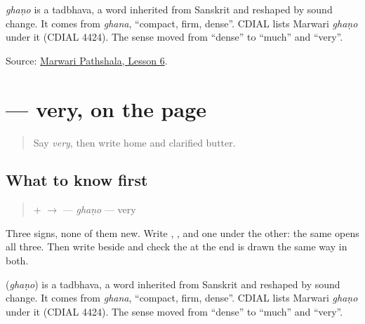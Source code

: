 \begin{cousinweb}
\emph{ghaṇo} is a tadbhava, a word inherited from Sanskrit and reshaped by sound change. It comes from \emph{ghana}, \textquotedblleft{}compact, firm, dense\textquotedblright{}. CDIAL lists Marwari \emph{ghaṇo} under it (CDIAL 4424). The sense moved from \textquotedblleft{}dense\textquotedblright{} to \textquotedblleft{}much\textquotedblright{} and \textquotedblleft{}very\textquotedblright{}.
\end{cousinweb}

\begin{tcolorbox}[breakable,colback=teal!4,colframe=teal!35!black,title={Before you move on}]
Source: \href{https://www.marwaripathshala.com/marwari-lesson-6-english}{Marwari Pathshala, Lesson 6}.
\end{tcolorbox}
\section[\texorpdfstring{\mw{घणो} (ghaṇo)}{घणो (ghaṇo)}]{ — very, on the page}

\label{lesson:MW-C23-ghano}



\begin{quote}
Say \emph{very}, then write home and clarified butter.
\end{quote}

\subsection*{What to know first}
\begin{quote}
\textbf{} + \textbf{} $\to$ \textbf{} — \emph{ghaṇo} — very
\end{quote}

Three signs, none of them new. Write \textbf{}, \textbf{}, and \textbf{} one under the other: the same \textbf{} opens all three. Then write \textbf{} beside \textbf{} and check the \textbf{} at the end is drawn the same way in both.

\begin{cousinweb}
\textbf{} (\emph{ghaṇo}) is a tadbhava, a word inherited from Sanskrit and reshaped by sound change. It comes from \emph{ghana}, \textquotedblleft{}compact, firm, dense\textquotedblright{}. CDIAL lists Marwari \emph{ghaṇo} under it (CDIAL 4424). The sense moved from \textquotedblleft{}dense\textquotedblright{} to \textquotedblleft{}much\textquotedblright{} and \textquotedblleft{}very\textquotedblright{}.
\end{cousinweb}

